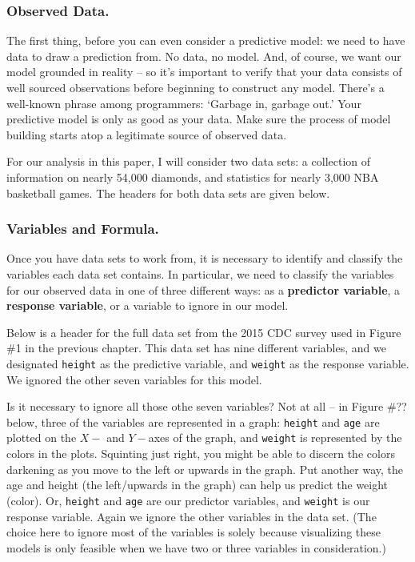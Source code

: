 \documentclass[12pt]{article}
\begin{document}
	\subsubsection{Observed Data.}
	The first thing, before you can even consider a predictive model:  we need to have data to draw a prediction from.  No data, no model.  And,
of course, we want our model grounded in reality -- so it's important to verify that your data consists of well sourced observations before 
beginning to construct any model.  There's a well-known phrase among programmers:  `Garbage in, garbage out.'  Your predictive model is only as 
good as your data.  Make sure the process of model building starts atop a legitimate source of observed data.

	For our analysis in this paper, I will consider two data sets:  a collection of information on nearly 54,000 diamonds, and statistics for 
nearly 3,000 NBA basketball games.  The headers for both data sets are given below.


	\subsubsection{Variables and Formula.}
	Once you have data sets to work from, it is necessary to identify and classify the variables each data set contains.  In particular, we 
need to classify the variables for our observed data in one of three different ways: as a \textbf{predictor variable}, a \textbf{response variable},
or a variable to ignore in our model.  

Below is a header for the full data set from the 2015 CDC survey used in Figure \#1 in the previous chapter.  This data set has nine different 
variables, and we designated \texttt{height} as the predictive variable, and \texttt{weight} as the response variable.  We ignored the other seven 
variables for this model.

	Is it necessary to ignore all those othe seven variables? Not at all -- in Figure \#?? below, three of the variables are represented in a
graph:  \texttt{height} and \texttt{age} are plotted on the $X-$ and $Y-$axes of the graph, and \texttt{weight} is represented by the colors in the
plots.  Squinting just right, you might be able to discern the colors darkening as you move to the left or upwards in the graph.  Put another way,
the age and height (the left/upwards in the graph) can help us predict the weight (color).  Or, \texttt{height} and \texttt{age} are our predictor
variables, and \texttt{weight} is our response variable.  Again we ignore the other variables in the data set.  (The choice here to ignore most of 
the variables is solely because visualizing these models is only feasible when we have two or three variables in consideration.)
\end{document}

